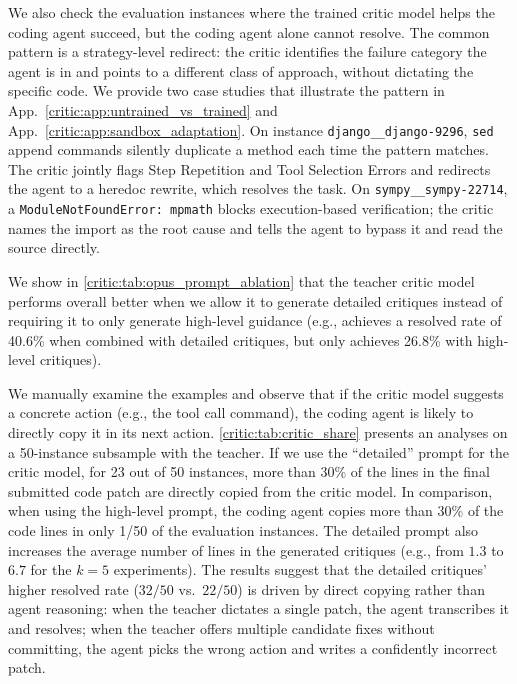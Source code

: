 We also check the evaluation instances where the trained critic model helps the coding agent succeed, but the coding agent alone cannot resolve. 
The common pattern is a strategy-level redirect: the critic identifies the failure category the agent is in and points to a different class of approach, without dictating the specific code. 
We provide two case studies that illustrate the pattern in App.~\ref{critic:app:untrained_vs_trained} and App.~\ref{critic:app:sandbox_adaptation}. 
On instance \texttt{django\_\_django-9296}, \texttt{sed} append commands silently duplicate a method each time the pattern matches. The critic jointly flags Step Repetition and Tool Selection Errors and redirects the agent to a heredoc rewrite, which resolves the task. 
On \texttt{sympy\_\_sympy-22714}, a \texttt{ModuleNotFoundError: mpmath} blocks execution-based verification; the critic names the import as the root cause and tells the agent to bypass it and read the source directly.

We show in \autoref{critic:tab:opus_prompt_ablation} that the teacher critic model performs overall better when we allow it to generate detailed critiques instead of requiring it to only generate high-level guidance (e.g., \criticqwenThirtyTwoB{} achieves a resolved rate of 40.6\% when combined with detailed critiques, but only achieves 26.8\% with high-level critiques).

We manually examine the examples and observe that if the critic model suggests a concrete action (e.g., the tool call command),
the coding agent is likely to directly copy it in its next action.
\autoref{critic:tab:critic_share} presents an analyses on a 50-instance subsample with the \criticopus{} teacher. 
If we use the ``detailed'' prompt for the critic model, for 23 out of 50 instances, more than 30\% of the lines in the final submitted code patch are directly copied from the critic model.
In comparison, when using the high-level prompt, the coding agent copies more than 30\% of the code lines in only 1/50 of the evaluation instances.
The detailed prompt also increases the average number of lines in the generated critiques (e.g., from $1.3$ to $6.7$ for the $k=5$ experiments).
The results suggest that the detailed critiques' higher resolved rate ($32/50$ vs.\ $22/50$) is driven by direct copying rather than agent reasoning: when the teacher dictates a single patch, the agent transcribes it and resolves; when the teacher offers multiple candidate fixes without committing, the agent picks the wrong action and writes a confidently incorrect patch. 

